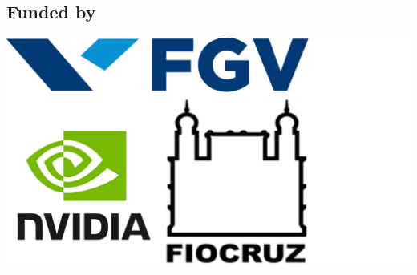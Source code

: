 \documentclass[a0,portrait]{a0poster}
\begin{document}
\begin{multicols}{3}





\small
\nocite{*} %


\section*{Funded by}
\begin{center}\vspace{0cm}
\includegraphics[width=0.65\linewidth]{figures/fundedby.png}
\end{center}%


\end{multicols}
\end{document}
